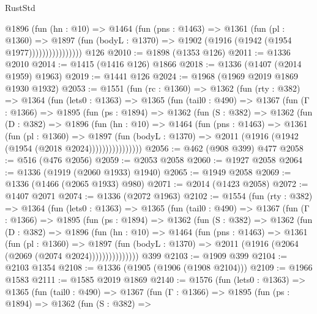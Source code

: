 \begin{lexlean}{RustStd}
\begin{coremodule}
{\begin{coremodule}
{{{{{{{{{{{{{{                    @1896
                      (fun (hn : @10) =>
                      @1464
                        (fun (pns : @1463) =>
                        @1361
                          (fun (pl : @1360) =>
                          @1897
                            (fun (bodyL : @1370) => @1902 (@1916 (@1942 (@1954 @1977))))))))))))))))
    @126
@2010 := @1898 (@1353 @126)
@2011 := @1336 @2010
@2014 := @1415 (@1416 @126) @1866
@2018 := @1336 (@1407 (@2014 @1959) @1963)
@2019 := @1441 @126
@2024 := @1968 (@1969 @2019 @1869 @1930 @1932)
@2053 := @1551
    (fun (rc : @1360) =>
    @1362
      (fun (rty : @382) =>
      @1364
        (fun (lets0 : @1363) =>
        @1365
          (fun (tail0 : @490) =>
          @1367
            (fun (Γ : @1366) =>
            @1895
              (fun (ps : @1894) =>
              @1362
                (fun (S : @382) =>
                @1362
                  (fun (D : @382) =>
                  @1896
                    (fun (hn : @10) =>
                    @1464
                      (fun (pns : @1463) =>
                      @1361
                        (fun (pl : @1360) =>
                        @1897
                          (fun (bodyL : @1370) =>
                          @2011 (@1916 (@1942 (@1954 (@2018 @2024))))))))))))))))
@2056 := @462 (@908 @399) @477
@2058 := @516 (@476 @2056)
@2059 := @2053 @2058
@2060 := @1927 @2058
@2064 := @1336 (@1919 (@2060 @1933) @1940)
@2065 := @1949 @2058
@2069 := @1336 (@1466 (@2065 @1933) @980)
@2071 := @2014 (@1423 @2058)
@2072 := @1407 @2071
@2074 := @1336 (@2072 @1963)
@2102 := @1554
    (fun (rty : @382) =>
    @1364
      (fun (lets0 : @1363) =>
      @1365
        (fun (tail0 : @490) =>
        @1367
          (fun (Γ : @1366) =>
          @1895
            (fun (ps : @1894) =>
            @1362
              (fun (S : @382) =>
              @1362
                (fun (D : @382) =>
                @1896
                  (fun (hn : @10) =>
                  @1464
                    (fun (pns : @1463) =>
                    @1361
                      (fun (pl : @1360) =>
                      @1897
                        (fun (bodyL : @1370) =>
                        @2011 (@1916 (@2064 (@2069 (@2074 @2024)))))))))))))))
    @399
@2103 := @1909 @399
@2104 := @2103 @1354
@2108 := @1336 (@1905 (@1906 (@1908 @2104)))
@2109 := @1966 @1583
@2111 := @1585 @2019 @1869
@2140 := @1576
    (fun (lets0 : @1363) =>
    @1365
      (fun (tail0 : @490) =>
      @1367
        (fun (Γ : @1366) =>
        @1895
          (fun (ps : @1894) =>
          @1362
            (fun (S : @382) =>
}}}}}}}}}}}}}}
\end{coremodule}}
\end{coremodule}
\end{lexlean}
